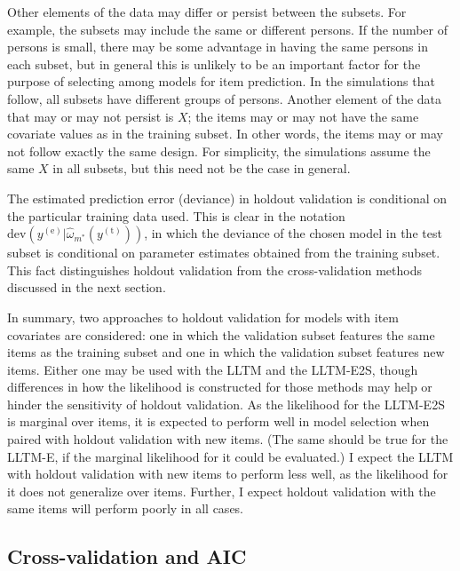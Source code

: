 Other elements of the data may differ or persist between the subsets. For example, the subsets may include the same or different persons. If the number of persons is small, there may be some advantage in having the same persons in each subset, but in general this is unlikely to be an important factor for the purpose of selecting among models for item prediction. In the simulations that follow, all subsets have different groups of persons. Another element of the data that may or may not persist is $X$; the items may or may not have the same covariate values as in the training subset. In other words, the items may or may not follow exactly the same design. For simplicity, the simulations assume the same $X$ in all subsets, but this need not be the case in general.

The estimated prediction error (deviance) in holdout validation is conditional on the particular training data used. This is clear in the notation
	$\mathrm{dev}(y^{(\mathrm{e})} | \hat \omega_{m^*}(y^{(\mathrm{t})}))$, 
in which the deviance of the chosen model in the test subset is conditional on parameter estimates obtained from the training subset.
This fact distinguishes holdout validation from the cross-validation methods discussed in the next section.
		
In summary, two approaches to holdout validation for models with item covariates are considered: one in which the validation subset features the same items as the training subset and one in which the validation subset features new items. Either one may be used with the LLTM and the LLTM-E2S, though differences in how the likelihood is constructed for those methods may help or hinder the sensitivity of holdout validation. As the likelihood for the LLTM-E2S is marginal over items, it is expected to perform well in model selection when paired with holdout validation with new items. (The same should be true for the LLTM-E, if the marginal likelihood for it could be evaluated.) I expect the LLTM with holdout validation with new items to perform less well, as the likelihood for it does not generalize over items. Further, I expect holdout validation with the same items will perform poorly in all cases.


\subsection{Cross-validation and AIC}

